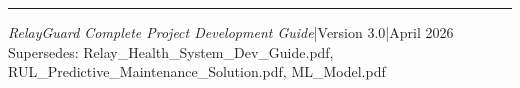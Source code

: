 \documentclass[12pt,a4paper]{article}
\begin{document}
\vspace{1.5em}
\hrule
\vspace{0.5em}
{\small\centering
\textit{RelayGuard Complete Project Development Guide}\quad|\quad Version 3.0\quad|\quad April 2026\\
Supersedes: Relay\_Health\_System\_Dev\_Guide.pdf, RUL\_Predictive\_Maintenance\_Solution.pdf, ML\_Model.pdf
\par}
\end{document}
